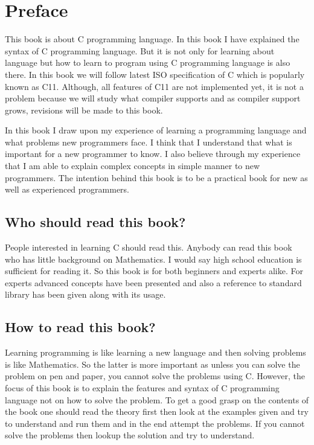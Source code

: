 \chapter{Preface}
This book is about C programming language. In this book I have explained the
syntax of C programming language. But it is not only for learning about
language but how to learn to program using C programming language is also
there. In this book we will follow latest ISO specification of C which is
popularly known as C11. Although, all features of C11 are not implemented
yet, it is not a problem because we will study what compiler supports and as
compiler support grows, revisions will be made to this book.

In this book I draw upon my experience of learning a programming language and
what problems new programmers face. I think that I understand that what is
important for a new programmer to know. I also believe through my experience
that I am able to explain complex concepts in simple manner to new
programmers. The intention behind this book is to be a practical book for new
as well as experienced programmers.

\section*{Who should read this book?}
People interested in learning C should read this. Anybody can read this book
who has little background on Mathematics. I would say high school education is
sufficient for reading it. So this book is for both beginners and experts
alike. For experts advanced concepts have been presented and also a reference
to standard library has been given along with its usage.

\section*{How to read this book?}
Learning programming is like learning a new language and then solving
problems is like Mathematics. So the latter is more important as unless you can
solve the problem on pen and paper, you cannot solve the problems using
C. However, the focus of this book is to explain the features and syntax of C
programming language not on how to solve the problem. To get a good grasp
on the contents of the book one should read the theory first then look at the
examples given and try to understand and run them and in the end attempt
the problems. If you cannot solve the problems then lookup the solution and
try to understand.

